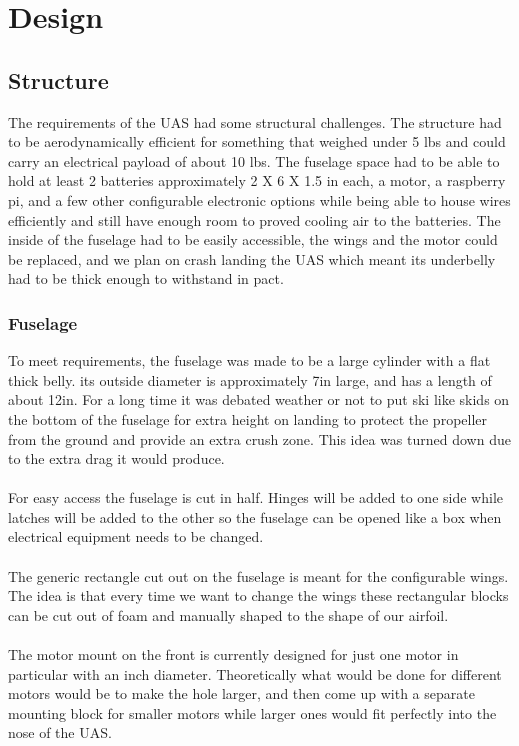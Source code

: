 \documentclass{report}
\begin{document}
\chapter{Design}
\section{Structure}
The requirements of the UAS had some structural challenges. The structure had to be aerodynamically efficient for something that weighed under 5 lbs and could carry an electrical payload of about 10 lbs. The fuselage space had to be able to hold at least 2 batteries approximately 2 X 6 X 1.5 in each, a motor, a raspberry pi, and a few other configurable electronic options while being able to house wires efficiently and still have enough room to proved cooling air to the batteries. The inside of the fuselage had to be easily accessible, the wings and the motor could be replaced, and we plan on crash landing the UAS which meant its underbelly had to be thick enough to withstand in pact.
\\
\subsection{Fuselage}
To meet requirements, the fuselage was made to be a large cylinder with a flat thick belly. its outside diameter is approximately 7in large, and has a length of about 12in. For a long time it was debated weather or not to put ski like skids on the bottom of the fuselage for extra height on landing to protect the propeller from the ground and provide an extra crush zone. This idea was turned down due to the extra drag it would produce.
\\
\\For easy access the fuselage is cut in half. Hinges will be added to one side while latches will be added to the other so the fuselage can be opened like a box when electrical equipment needs to be changed.
\\
\\The generic rectangle cut out on the fuselage is meant for the configurable wings. The idea is that every time we want to change the wings these rectangular blocks can be cut out of foam and manually shaped to the shape of our airfoil.
\\
\\The motor mount on the front is currently designed for just one motor in particular with an inch diameter. Theoretically what would be done for different motors would be to make the hole larger, and then come up with a separate mounting block for smaller motors while larger ones would fit perfectly into the nose of the UAS.
\end{document}
